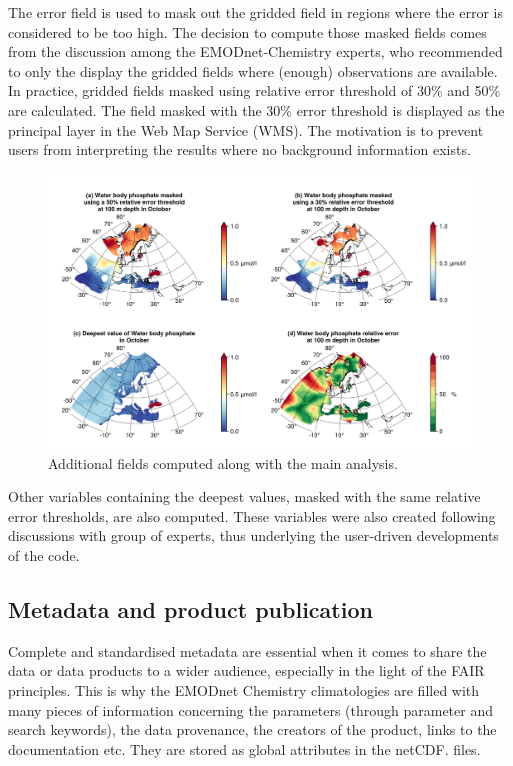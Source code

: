 \documentclass[essd, manuscript]{copernicus}
\begin{document}
The error field is used to mask out the gridded field in regions where the error is considered to be too high. The decision to compute those masked fields comes from the discussion among the EMODnet-Chemistry experts, who recommended to only the display the gridded fields where (enough) observations are available. In practice, gridded fields masked using relative error threshold of 30\% and 50\% are calculated. The field masked with the 30\% error threshold is displayed as the principal layer in the Web Map Service (WMS). The motivation is to prevent users from interpreting the results where no background information exists. 

\begin{figure}[t]
\includegraphics[width=\textwidth]{Water_body_phosphate_depth-100_month-10_additional_fields.png}
\caption{Additional fields computed along with the main analysis.\label{fig:additionalfields}}
\end{figure}

Other variables containing the deepest values, masked with the same relative error thresholds, are also computed. These variables were also created following discussions with group of experts, thus underlying the user-driven developments of the code.

\subsection{Metadata and product publication}

Complete and standardised metadata are essential when it comes to share the data or data products to a wider audience, especially in the light of the FAIR principles. This is why the EMODnet Chemistry climatologies are filled with many pieces of information concerning the parameters (through parameter and search keywords), the data provenance, the creators of the product, links to the documentation etc. They are stored as global attributes in the netCDF.  files.
\end{document}
